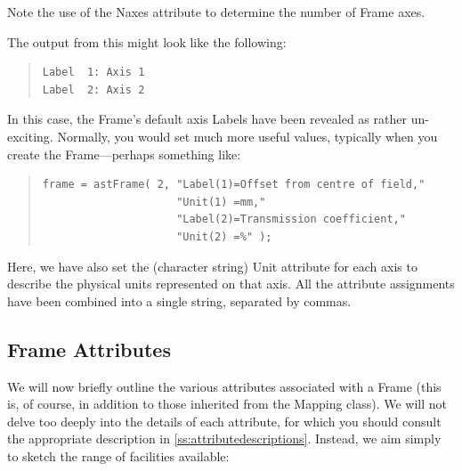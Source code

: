 \documentclass[twoside,11pt]{article}
\newcommand{\htmlref}[2]{#1}
\newcommand{\appref}[1]{Appendix~\ref{#1}}
\renewcommand{\appref}[1]{\ref{#1}}
\begin{document}
Note the use of the \htmlref{Naxes}{Naxes} attribute to determine the number of Frame
axes.

The output from this might look like the following:

\begin{quote}
\begin{verbatim}
Label  1: Axis 1
Label  2: Axis 2
\end{verbatim}
\end{quote}

In this case, the Frame's default axis Labels have been revealed as
rather un-exciting. Normally, you would set much more useful values,
typically when you create the Frame---perhaps something like:

\begin{quote}
\small
\begin{verbatim}
frame = astFrame( 2, "Label(1)=Offset from centre of field,"
                     "Unit(1) =mm,"
                     "Label(2)=Transmission coefficient,"
                     "Unit(2) =%" );
\end{verbatim}
\normalsize
\end{quote}

Here, we have also set the (character string) Unit attribute for each
axis to describe the physical units represented on that axis. All the
attribute assignments have been combined into a single string,
separated by commas.

\subsection{\label{ss:frameattributes}Frame Attributes}

We will now briefly outline the various attributes associated with a
\htmlref{Frame}{Frame} (this is, of course, in addition to those inherited from the
\htmlref{Mapping}{Mapping} class). We will not delve too deeply into the details of each
attribute, for which you should consult the appropriate description in
\appref{ss:attributedescriptions}. Instead, we aim simply to sketch
the range of facilities available:
\end{document}
